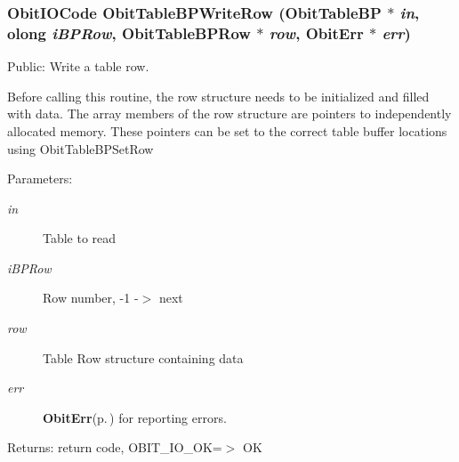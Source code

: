 \subsubsection{\setlength{\rightskip}{0pt plus 5cm}Obit\-IOCode Obit\-Table\-BPWrite\-Row ({\bf Obit\-Table\-BP} $\ast$ {\em in}, {\bf olong} {\em i\-BPRow}, {\bf Obit\-Table\-BPRow} $\ast$ {\em row}, {\bf Obit\-Err} $\ast$ {\em err})}\label{ObitTableBP_8c_a24}


Public: Write a table row. 

Before calling this routine, the row structure needs to be initialized and filled with data. The array members of the row structure are pointers to independently allocated memory. These pointers can be set to the correct table buffer locations using Obit\-Table\-BPSet\-Row \begin{Desc}
\item[Parameters:]
\begin{description}
\item[{\em in}]Table to read \item[{\em i\-BPRow}]Row number, -1 -$>$ next \item[{\em row}]Table Row structure containing data \item[{\em err}]{\bf Obit\-Err}{\rm (p.\,\pageref{structObitErr})} for reporting errors. \end{description}
\end{Desc}
\begin{Desc}
\item[Returns:]return code, OBIT\_\-IO\_\-OK=$>$ OK \end{Desc}
